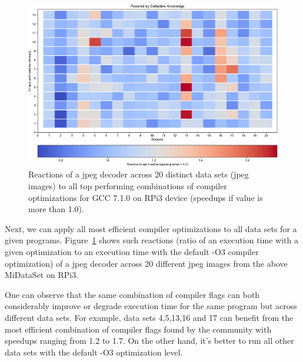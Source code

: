    \begin{figure}[!htbp]
     \centering
      \includegraphics[width=5.8in]
      {ck-assets/9f93e8520adbea97-cropped.pdf} %
     \caption{
       Reactions of a jpeg decoder across 20 distinct data sets (jpeg images)
       to all top performing combinations of compiler optimizations
       for GCC 7.1.0 on RPi3 device (speedups if value is more than 1.0).
     }                                         
     \label{fig:ck-datasets-jpeg-d-reactions}
   \end{figure}

Next, we can apply all most efficient compiler optimizations to all data sets 
for a given programs.
%
Figure~\ref{fig:ck-datasets-jpeg-d-reactions} shows such reactions 
(ratio of an execution time with a given optimization to an execution time 
with the default -O3 compiler optimization) of a jpeg decoder across 
20 different jpeg images from the above MiDataSet on RPi3.

One can observe that the same combination of compiler flags can both
considerably improve or degrade execution time for the same program
but across different data sets.
%
For example, data sets 4,5,13,16 and 17 can benefit from the most
efficient combination of compiler flags found by the community
with speedups ranging from 1.2 to 1.7.
%
On the other hand, it's better to run all other data sets with
the default -O3 optimization level.

